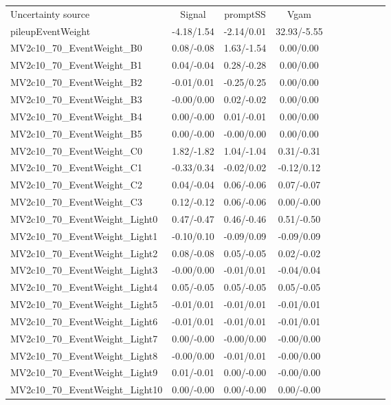 \begin{table}[h]
\scriptsize
\begin{center}
\begin{tabular}{l|ccccccccc}
\hline
\hline
Uncertainty source &Signal &promptSS &Vgam \\
pileupEventWeight &-4.18/1.54 &-2.14/0.01 &32.93/-5.55 \\
MV2c10\_70\_EventWeight\_B0 &0.08/-0.08 &1.63/-1.54 &0.00/0.00 \\
MV2c10\_70\_EventWeight\_B1 &0.04/-0.04 &0.28/-0.28 &0.00/0.00 \\
MV2c10\_70\_EventWeight\_B2 &-0.01/0.01 &-0.25/0.25 &0.00/0.00 \\
MV2c10\_70\_EventWeight\_B3 &-0.00/0.00 &0.02/-0.02 &0.00/0.00 \\
MV2c10\_70\_EventWeight\_B4 &0.00/-0.00 &0.01/-0.01 &0.00/0.00 \\
MV2c10\_70\_EventWeight\_B5 &0.00/-0.00 &-0.00/0.00 &0.00/0.00 \\
MV2c10\_70\_EventWeight\_C0 &1.82/-1.82 &1.04/-1.04 &0.31/-0.31 \\
MV2c10\_70\_EventWeight\_C1 &-0.33/0.34 &-0.02/0.02 &-0.12/0.12 \\
MV2c10\_70\_EventWeight\_C2 &0.04/-0.04 &0.06/-0.06 &0.07/-0.07 \\
MV2c10\_70\_EventWeight\_C3 &0.12/-0.12 &0.06/-0.06 &0.00/-0.00 \\
MV2c10\_70\_EventWeight\_Light0 &0.47/-0.47 &0.46/-0.46 &0.51/-0.50 \\
MV2c10\_70\_EventWeight\_Light1 &-0.10/0.10 &-0.09/0.09 &-0.09/0.09 \\
MV2c10\_70\_EventWeight\_Light2 &0.08/-0.08 &0.05/-0.05 &0.02/-0.02 \\
MV2c10\_70\_EventWeight\_Light3 &-0.00/0.00 &-0.01/0.01 &-0.04/0.04 \\
MV2c10\_70\_EventWeight\_Light4 &0.05/-0.05 &0.05/-0.05 &0.05/-0.05 \\
MV2c10\_70\_EventWeight\_Light5 &-0.01/0.01 &-0.01/0.01 &-0.01/0.01 \\
MV2c10\_70\_EventWeight\_Light6 &-0.01/0.01 &-0.01/0.01 &-0.01/0.01 \\
MV2c10\_70\_EventWeight\_Light7 &0.00/-0.00 &-0.00/0.00 &-0.00/0.00 \\
MV2c10\_70\_EventWeight\_Light8 &-0.00/0.00 &-0.01/0.01 &-0.00/0.00 \\
MV2c10\_70\_EventWeight\_Light9 &0.01/-0.01 &0.00/-0.00 &-0.00/0.00 \\
MV2c10\_70\_EventWeight\_Light10 &0.00/-0.00 &0.00/-0.00 &0.00/-0.00 \\

\end{tabular}
\end{center}
\end{table}
